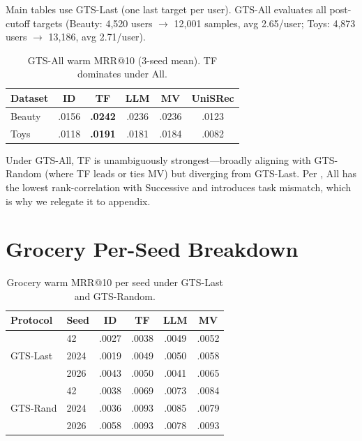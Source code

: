 \documentclass[sigconf,natbib=true,anonymous]{acmart}
\begin{document}
Main tables use GTS-Last (one last target per user).
GTS-All evaluates all post-cutoff targets (Beauty: 4{,}520 users $\to$ 12{,}001 samples, avg 2.65/user; Toys: 4{,}873 users $\to$ 13{,}186, avg 2.71/user).

\begin{table}[h]
\centering
\caption{GTS-All warm MRR@10 (3-seed mean).  TF dominates under All.}
\label{tab:gts-all}
\small
\begin{tabular}{@{}lccccc@{}}
\toprule
Dataset & ID & TF & LLM & MV & UniSRec \\
\midrule
Beauty & .0156 & \textbf{.0242} & .0236 & .0236 & .0123 \\
Toys   & .0118 & \textbf{.0191} & .0181 & .0184 & .0082 \\
\bottomrule
\end{tabular}
\end{table}

Under GTS-All, TF is unambiguously strongest---broadly aligning with GTS-Random (where TF leads or ties MV) but diverging from GTS-Last.
Per \citet{gusak2025time}, All has the lowest rank-correlation with Successive and introduces task mismatch, which is why we relegate it to appendix.

\section{Grocery Per-Seed Breakdown}
\label{app:grocery}

\begin{table}[h]
\centering
\caption{Grocery warm MRR@10 per seed under GTS-Last and GTS-Random.}
\label{tab:grocery-perseed}
\small
\setlength{\tabcolsep}{3pt}
\begin{tabular}{@{}llcccc@{}}
\toprule
Protocol & Seed & ID & TF & LLM & MV \\
\midrule
\multirow{3}{*}{GTS-Last}
 & 42    & .0027 & .0038 & .0049 & .0052 \\
 & 2024  & .0019 & .0049 & .0050 & .0058 \\
 & 2026  & .0043 & .0050 & .0041 & .0065 \\
\midrule
\multirow{3}{*}{GTS-Rand}
 & 42    & .0038 & .0069 & .0073 & .0084 \\
 & 2024  & .0036 & .0093 & .0085 & .0079 \\
 & 2026  & .0058 & .0093 & .0078 & .0093 \\
\bottomrule
\end{tabular}
\end{table}
\end{document}
